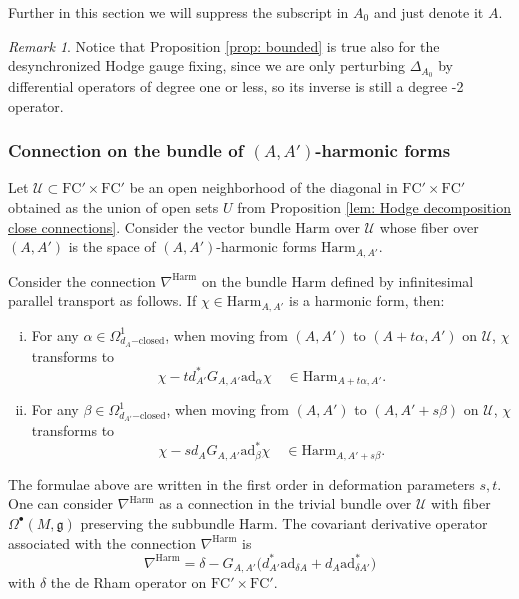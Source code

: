 \documentclass[11pt,a4paper]{amsart}
\theoremstyle{plain} %
\theoremstyle{definition}
\theoremstyle{remark}
\newtheorem{rem}[thm]{Remark}
\newcommand{\g}{\mathfrak{g}}
\newcommand{\mr}{\mathrm}
\newcommand{\bt}{\bullet}
\newcommand{\mc}{\mathcal}
\newcommand{\FC}{\mathrm{FC}}
\begin{document}
{Further in this section we will suppress the subscript in $A_0$ and just denote it $A$. 
\begin{rem}
    Notice that Proposition \ref{prop: bounded} is true also for the desynchronized Hodge gauge fixing, since we are only perturbing $\Delta_{A_0}$ by differential operators of degree one or less, so its inverse is still a degree -2 operator. 
\end{rem}


\subsubsection{Connection on the bundle of $(A,A')$-harmonic forms}\label{sss nabla^Harm}
Let $\mc{U}\subset \FC'\times \FC'$ be an open neighborhood of the diagonal in $\FC'\times \FC'$ obtained as the union of open sets $U$ from Proposition \ref{lem: Hodge decomposition close connections}.
Consider the vector bundle $\mr{Harm}$ over $\mc{U}$ whose fiber over $(A,A')$ is the space of $(A,A')$-harmonic forms $\mr{Harm}_{A,A'}$.

Consider the connection $\nabla^\mr{Harm}$ on the bundle $\mr{Harm}$ defined by infinitesimal parallel transport as follows. If $\chi\in \mr{Harm}_{A,A'}$ is a harmonic form, then:
\begin{enumerate}[(i)]
    \item For any $\alpha\in \Omega^1_{d_{A}\mr{-closed}}$, when moving from $(A,A')$ to $(A+t \alpha,A')$ on $\mc{U}$, $\chi$ transforms to 
    \begin{equation}\label{nabla^harm infinitesimal horizontal transport}
    \chi-t d^*_{A'}G_{A,A'}\mr{ad}_\alpha \chi\quad \in \mr{Harm}_{A+t\alpha,A'}.
    \end{equation}
    \item For any $\beta\in \Omega^1_{d_{A'}\mr{-closed}}$, when moving from $(A,A')$ to $(A,A'+s \beta)$ on $\mc{U}$, $\chi$ transforms to 
    \begin{equation}\label{nabla^harm infinitesimal vertical transport}
    \chi-s d_{A}G_{A,A'}\mr{ad}^*_\beta\chi\quad \in \mr{Harm}_{A,A'+s\beta}.
    \end{equation}
\end{enumerate}
The formulae above are written in the first order in deformation parameters $s,t$. 
One can consider $\nabla^\mr{Harm}$ as a connection in the trivial bundle over $\mc{U}$ with fiber $\Omega^\bt(M,\g)$ preserving the subbundle $\mr{Harm}$.
The covariant derivative operator associated with the connection $\nabla^\mr{Harm}$  is
\begin{equation}\label{nabla^Harm}
 \nabla^\mr{Harm}=\delta-G_{A,A'}\Big(d^*_{A'}\mr{ad}_{\delta A}+d_{A}\mr{ad}^*_{\delta A'}\Big)
\end{equation}
with $\delta$ the de Rham operator on $\FC'\times \FC'$.


}
\end{document}
